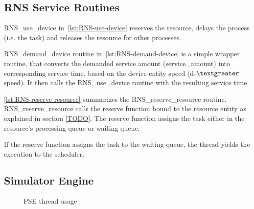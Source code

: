 
\subsection{RNS Service Routines}
\label{sec:rns-service-routines}



RNS\_use\_device in~\ref{lst:RNS-use-device} reserves the resource, delays the process (i.e. the task) and releases the resource for other processes.



RNS\_demand\_device routine in~\ref{lst:RNS-demand-device} is a simple wrapper routine, that converts the demanded service amount (service\_amount) into corresponding service time, based on the device entity speed (d-$\textgreater$speed). It then calls the RNS\_use\_device routine with the resulting service time.



\ref{lst:RNS-reserve-resource} summarizes the RNS\_reserve\_resource routine. RNS\_reserve\_resource calls the reserve function bound to the resource entity as explained in section \ref{TODO}. The reserve function assigns the task either in the resource's processing queue or waiting queue.

If the reserve function assigns the task to the waiting queue, the thread yields the execution to the scheduler.




\subsection{Simulator Engine}
\label{sec:simulator-engine}

\begin{figure}[ht]
  \begin{center}
    \caption{PSE thread usage}
    \label{fig:rns-threads}
  \end{center}
\end{figure}


